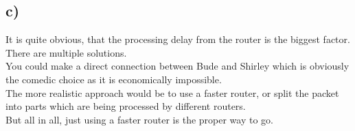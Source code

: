\documentclass[12pt, a4paper]{article}
\begin{document}
\subsection*{c)}
It is quite obvious, that the processing delay from the router is the biggest factor. There are multiple solutions.\\
You could make a direct connection between Bude and Shirley which is obviously the comedic choice as it is economically impossible. \\
The more realistic approach would be to use a faster router, or split the packet into parts which are being processed by different routers. \\
But all in all, just using a faster router is the proper way to go.
\end{document}
